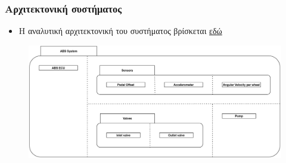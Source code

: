\documentclass[fleqn]{beamer}
\begin{document}
\begin{frame}
  \frametitle{Αρχιτεκτονική συστήματος}
  \begin{itemize}
   \item Η αναλυτική αρχιτεκτονική του συστήματος βρίσκεται   \href{https://drive.google.com/file/d/1vFFA7gmCW2vK_F3lPBO-nykZZAyVAGi6/view?usp=sharing}{εδώ} 
  \end{itemize}
  \begin{figure}[h]
    \begin{center}
    \includegraphics[scale=0.15]{images/system-architecture-overview.png}
    \end{center}
  \end{figure}
\end{frame}
\end{document}
